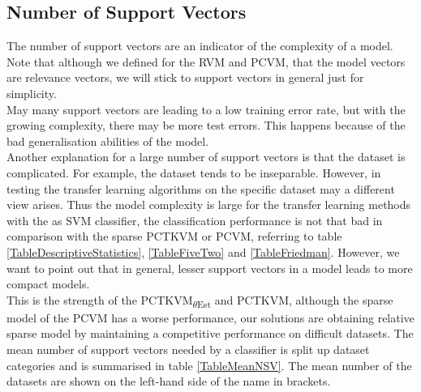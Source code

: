 \subsection{Number of Support Vectors}\label{EmSubSecNumberSV}
The number of support vectors are an indicator of the complexity of a model. 
Note that although we defined for the \acs{RVM} and \acs{PCVM}, that the model vectors are relevance vectors, we will stick to support vectors in general just for simplicity.\\
May many support vectors are leading to a low training error rate, but with the growing complexity, there may be more test errors. 
This happens because of the bad generalisation abilities of the model.\cite[p. 81]{Igual.2017}\\
Another explanation for a large number of support vectors is that the dataset is complicated. For example, the dataset tends to be inseparable.\cite[p. 78;86]{Abe.2010}
However, in testing the transfer learning algorithms on the specific dataset may a different view arises. 
Thus the model complexity is large for the transfer learning methods with the as \acs{SVM} classifier, the classification performance is not that bad in comparison with the sparse \acs{PCTKVM} or \acs{PCVM}, referring to table \ref{TableDescriptiveStatistics}, \ref{TableFiveTwo} and \ref{TableFriedman}.
However, we want to point out that in general, lesser support vectors in a model leads to more compact models.\cite[p. 349]{Bishop.2009}\\
This is the strength of the \acs{PCTKVM}\textsubscript{$\theta$Est} and \acs{PCTKVM}, although the sparse model of the \acs{PCVM} has a worse performance, our solutions are obtaining relative sparse model by maintaining a competitive performance on difficult datasets.
The mean number of support vectors needed by a classifier is split up dataset categories and is summarised in table \ref{TableMeanNSV}. 
The mean number of the datasets are shown on the left-hand side of the name in brackets.
\begin{table}[h]
	\centering
\end{table}
\FloatBarrier
